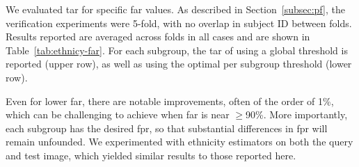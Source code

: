 \documentclass[10pt,twocolumn,letterpaper]{article}
\begin{document}
We evaluated \gls{tar} for specific \gls{far} values. As described in Section~\ref{subsec:pf}, the verification experiments were 5-fold, with no overlap in subject ID between folds. Results reported are averaged across folds in all cases and are shown in Table~\ref{tab:ethnicy-far}. For each subgroup, the \gls{tar} of using a global threshold is reported (upper row), as well as using the optimal per subgroup threshold (lower row). 

Even for lower \gls{far}, there are notable improvements, often of the order of 1\%, which can be challenging to achieve when \gls{far} is near $\geq$90\%. More importantly, each subgroup has the desired \gls{fpr}, so that substantial differences in \gls{fpr} will remain unfounded. We experimented with ethnicity estimators on both the query and test image, which yielded similar results to those reported here.
\end{document}

